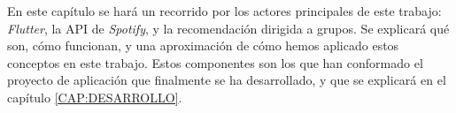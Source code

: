 En este capítulo se hará un recorrido por los actores principales de este trabajo: \textit{Flutter}, la API de
\textit{Spotify}, y la recomendación dirigida a grupos. Se explicará qué son, cómo funcionan, y una aproximación de 
cómo hemos aplicado estos conceptos en este trabajo. Estos componentes son los que han conformado el proyecto de 
aplicación que finalmente se ha desarrollado, y que se explicará en el capítulo \ref{CAP:DESARROLLO}.